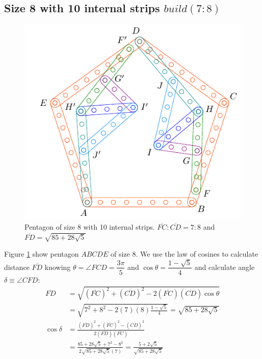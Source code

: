 \documentclass[11pt]{article}
\begin{document}
\subsection{Size 8 with 10 internal strips $build(7:8)$}

\begin{figure}[h]
\centering
\includegraphics[scale=1.1]{8/penta8-10b}
\caption{Pentagon of size 8 with 10 internal strips. $\overline{FC}:\overline{CD} = 7:8$ and $\overline{FD} = \sqrt{85 + 28\sqrt5}$}
\label{fig:penta8-10b}
\end{figure}

Figure \ref{fig:penta8-10b} show pentagon $ABCDE$ of size $8$. We use the law of cosines to calculate distance $\overline{FD}$ knowing $\theta = \angle{FCD} = \dfrac{3\pi}5$ and $\cos\theta = \dfrac{1-\sqrt5}4$ and calculate angle $\delta \equiv \angle{CFD}$:
\begin{align}
\overline{FD} &= \sqrt{(\overline{FC})^2 + (\overline{CD})^2
 - 2(\overline{FC})(\overline{CD})\cos\theta} \nonumber\\
 &= \sqrt{7^2 + 8^2 - 2(7)(8)\frac{1-\sqrt5}4} = \sqrt{85 + 28\sqrt5} \\
\cos\delta &= \frac{(\overline{FD})^2 + (\overline{FC})^2 - (\overline{CD})^2}
 {2(\overline{FD})(\overline{FC})} \nonumber\\
 &= \frac{85 + 28\sqrt5 + 7^2 - 8^2}{2\sqrt{85 + 28\sqrt5}(7)}
 = \frac{5 + 2\sqrt5}{\sqrt{85 + 28\sqrt5}}
\end{align}
\end{document}
